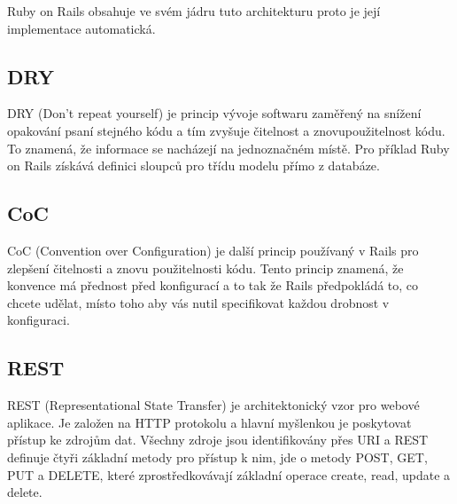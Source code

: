 Ruby on Rails obsahuje ve svém jádru tuto architekturu proto je její implementace automatická.

\subsection{DRY}
DRY (Don’t repeat yourself) je princip vývoje softwaru zaměřený na snížení opakování psaní stejného kódu a tím zvyšuje čitelnost a znovupoužitelnost kódu. To znamená, že informace se nacházejí na jednoznačném místě. Pro příklad Ruby on Rails získává definici sloupců pro třídu modelu přímo z databáze.  

\subsection{CoC}
CoC (Convention over Configuration) je další princip používaný v Rails pro zlepšení čitelnosti a znovu použitelnosti kódu. Tento princip znamená, že konvence má přednost před konfigurací a to tak že Rails předpokládá to, co chcete udělat, místo toho aby vás nutil specifikovat každou drobnost v konfiguraci. 

\subsection{REST}
REST (Representational State Transfer) je architektonický vzor pro webové aplikace. Je založen na HTTP protokolu a hlavní myšlenkou je poskytovat přístup ke zdrojům dat. Všechny zdroje jsou identifikovány přes URI a REST definuje čtyři základní metody pro přístup k nim, jde o metody POST, GET, PUT a DELETE, které zprostředkovávají základní operace create, read, update a delete.
